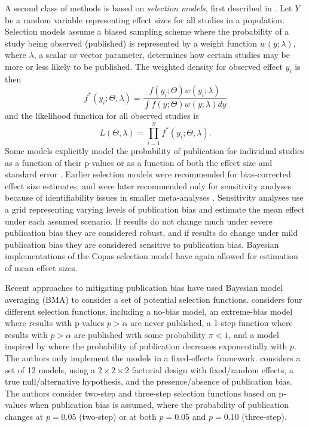 \documentclass[12pt]{article}   	%
\numberwithin{equation}{section}
\begin{document}
A second class of methods is based on \textit{selection models}, first described in \citet{hedges1984selection}. Let $Y$ be a random variable representing effect sizes for all studies in a population. Selection models assume a biased sampling scheme where the probability of a study being observed (published) is represented by a weight function $w(y; \lambda)$, where $\lambda$, a scalar or vector parameter, determines how certain studies may be more or less likely to be published. The weighted density for observed effect $y_i$ is then
\begin{equation}
f^*(y_i ;  \Theta, \lambda) = \frac{f(y_i;\Theta) w(y_i; \lambda)}{\int f(y ; \Theta) w(y; \lambda) dy}
\end{equation}
and the likelihood function for all observed studies is 
\begin{equation}
L(\Theta, \lambda) = \prod_{i = 1}^S f^*(y_i; \Theta, \lambda).
\end{equation}
Some models explicitly model the probability of publication for individual studies as a function of their p-values \citep{iyengar1988selection, hedges1992selection, givens1997, vevea1995pubbias} or as a function of both the effect size and standard error \citep{copas1999what, copas2000funnel, copas2001sensitivity}. Earlier selection models were recommended for bias-corrected effect size estimates, and were later recommended only for sensitivity analyses because of identifiability issues in smaller meta-analyses \citep{vevea2005sensitivity, jin2015methods}. Sensitivity analyses use a grid representing varying levels of publication bias and estimate the mean effect under each assumed scenario. If results do not change much under severe publication bias they are considered robust, and if results do change under mild publication bias they are considered sensitive to publication bias. Bayesian implementations of the Copas selection model \citep{mavridis2013copas, bai2020} have again allowed for estimation of mean effect sizes.

Recent approaches to mitigating publication bias have used Bayesian model averaging (BMA) to consider a set of potential selection functions. \citet{guan2016} considers four different selection functions, including a no-bias model, an extreme-bias model where results with p-values $p > \alpha$ are never published, a 1-step function where results with $p > \alpha$ are published with some probability $\pi < 1$, and a model inspired by \citet{givens1997} where the probability of publication decreases exponentially with $p$. The authors only implement the models in a fixed-effects framework. \citet{maier2020robma} considers a set of 12 models, using a $2 \times 2 \times 2$ factorial design with fixed/random effects, a true null/alternative hypothesis, and the presence/absence of publication bias. The authors consider two-step and three-step selection functions based on p-values when publication bias is assumed, where the probability of publication changes at $p=0.05$ (two-step) or at both $p = 0.05$ and $p = 0.10$ (three-step).  
\end{document}
